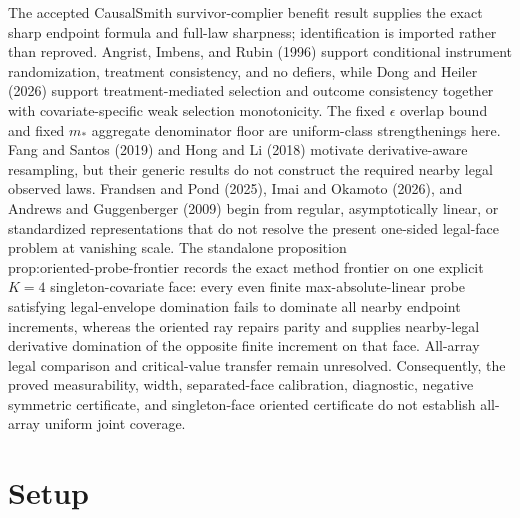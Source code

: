\documentclass{article}
\begin{document}
The accepted CausalSmith survivor-complier benefit result supplies the exact sharp endpoint formula and full-law sharpness; identification is imported rather than reproved. Angrist, Imbens, and Rubin (1996) support conditional instrument randomization, treatment consistency, and no defiers, while Dong and Heiler (2026) support treatment-mediated selection and outcome consistency together with covariate-specific weak selection monotonicity. The fixed \(\epsilon\) overlap bound and fixed \(m_*\) aggregate denominator floor are uniform-class strengthenings here. Fang and Santos (2019) and Hong and Li (2018) motivate derivative-aware resampling, but their generic results do not construct the required nearby legal observed laws. Frandsen and Pond (2025), Imai and Okamoto (2026), and Andrews and Guggenberger (2009) begin from regular, asymptotically linear, or standardized representations that do not resolve the present one-sided legal-face problem at vanishing scale. The standalone proposition \(\text{prop:oriented-probe-frontier}\) records the exact method frontier on one explicit \(K=4\) singleton-covariate face: every even finite max-absolute-linear probe satisfying legal-envelope domination fails to dominate all nearby endpoint increments, whereas the oriented ray repairs parity and supplies nearby-legal derivative domination of the opposite finite increment on that face. All-array legal comparison and critical-value transfer remain unresolved. Consequently, the proved measurability, width, separated-face calibration, diagnostic, negative symmetric certificate, and singleton-face oriented certificate do not establish all-array uniform joint coverage.

\section{Setup}
\end{document}
